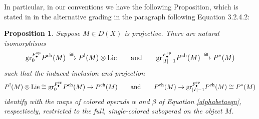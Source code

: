 \documentclass[11pt]{amsart}
\numberwithin{equation}{section}
\newtheorem{prop}[theo]{Proposition}
\theoremstyle{definition}
\newcommand{\spe}{{\textup{sp}}}
\newcommand{\Lie}{{\textup{Lie}}}
\newcommand{\ch}{{\textup{ch}}}
\newcommand{\0}{{\textbf{0}}}
\newcommand{\DD}{{D}}
\newcommand{\gr}{\textup{gr}}
\def\ch{{\rm ch}}
\begin{document}
In particular, in our conventions we have the following Proposition, which is stated in \cite{BD1} in the alternative grading in the paragraph following Equation 3.2.4.2:
\begin{prop} Suppose $M\in \DD(X)$ is projective. There are natural isomorphisms
	\[  \gr_0^{F^\spe_\bullet} P^\ch(M)\xrightarrow{\cong} P^!(M)\otimes\Lie   \qquad \text{and} \qquad \gr_{|I|-1}^{F^\spe_\bullet} P^\ch(M) \xrightarrow{\cong}   P^*(M)\]
such that the induced inclusion and projection
\[   P^!(M)\otimes\Lie \cong \gr_0^{F^\spe_\bullet} P^\ch(M) \to P^\ch(M) \qquad \text{and} \qquad  P^\ch(M) \to \gr_{|I|-1}^{F^\spe_\bullet} P^\ch(M)\cong P^*(M)  \]
identify with the maps of colored operads $\alpha$ and $\beta$ of Equation \ref{alphabetaeqn}, respectively, restricted to the full, single-colored suboperad on the object $M$.
\end{prop}
\end{document}
